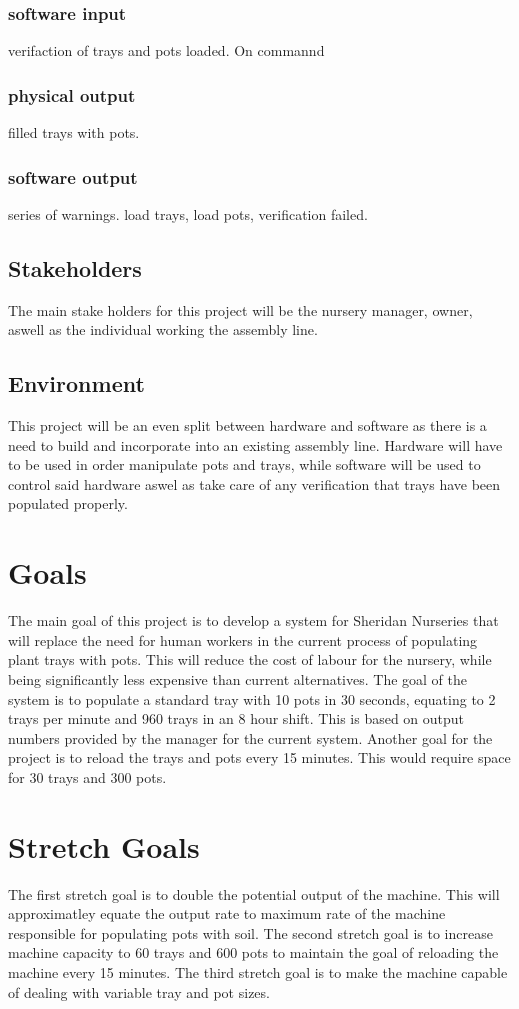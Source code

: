 \documentclass{article}
\begin{document}
\subsubsection{software input}
verifaction of trays and pots loaded. On commannd
\subsubsection{physical output}
filled trays with pots.
\subsubsection{software output}
series of warnings. load trays, load pots, verification failed.


\subsection{Stakeholders}
The main stake holders for this project will be the nursery manager, owner, aswell as the individual working the assembly line.

\subsection{Environment}
This project will be an even split between hardware and software as there is a need to build and incorporate into an existing assembly line.
Hardware will have to be used in order manipulate pots and trays, while software will be used to control said hardware 
aswel as take care of any verification that trays have been populated properly.
\section{Goals}
The main goal of this project is to develop a system for Sheridan Nurseries
that will replace the need for human workers in the current process of populating plant trays with pots. This will reduce the cost
of labour for the nursery, while being significantly less expensive than current alternatives. The goal of the system is to populate 
a standard tray with 10 pots in 30 seconds, equating to 2 trays per minute and 960 trays in an 8 hour shift. This is based on output 
numbers provided by the manager for the current system. Another goal for the project is to reload the trays and pots every 15 minutes.
This would require space for 30 trays and 300 pots.


\section{Stretch Goals}
The first stretch goal is to double the potential output of the machine. This will approximatley equate the output rate to maximum rate of the
machine responsible for populating pots with soil. The second stretch goal is to increase machine capacity to 60 trays and 600 pots to
maintain the goal of reloading the machine every 15 minutes. The third stretch goal is to make the machine capable of dealing with variable
tray and pot sizes.
\end{document}
